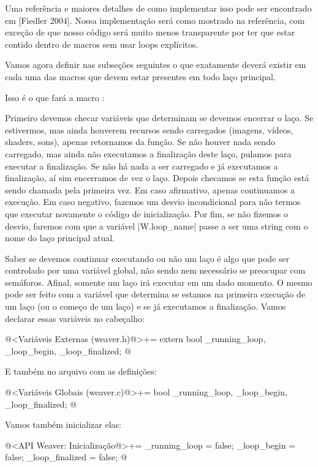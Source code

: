 Uma referência e maiores detalhes de como implementar isso pode ser
encontrado em [Fiedler 2004]. Nossa implementação será como mostrado
na referência, com exceção de que nosso código será muito menos
transparente por ter que estar contido dentro de macros sem usar loops
explícitos.

Vamos agora definir nas subseções seguintes o que exatamente deverá
existir em cada uma das macros que devem estar presentes em todo laço
principal.


Isso é o que fará a macro :

Primeiro devemos checar variáveis que determinam se devemos encerrar o
laço. Se estivermos, mas ainda houverem recursos sendo carregados
(imagens, vídeos, shaders, sons), apenas retornamos da função. Se não
houver nada sendo carregado, mas ainda não executamos a finalização
deste laço, pulamos para executar a finalização. Se não há nada a ser
carregado e já executamos a finalização, aí sim encerramos de vez o
laço. Depois checamos se esta função está sendo chamada pela primeira
vez. Em caso afirmativo, apenas continuamos a execução. Em caso
negativo, fazemos um desvio incondicional para não termos que executar
novamente o código de inicialização. Por fim, se não fizemos o desvio,
faremos com que a variável |W.loop_name| passe a ser uma string com o
nome do laço principal atual.

Saber se devemos continuar executando ou não um laço é algo que pode
ser controlado por uma variável global, não sendo nem necessário se
preocupar com semáforos. Afinal, somente um laço irá executar em um
dado momento. O mesmo pode ser feito com a variável que determina se
estamos na primeira execução de um laço (ou o começo de um laço) e se
já executamos a finalização. Vamos declarar essas variáveis no
cabeçalho:

\iniciocodigo
@<Variáveis Externas (weaver.h)@>+=
extern bool _running_loop, _loop_begin, _loop_finalized;
@
\fimcodigo

E também no arquivo com as definições:

\iniciocodigo
@<Variáveis Globais (weaver.c)@>+=
bool _running_loop, _loop_begin, _loop_finalized;
@
\fimcodigo

Vamos também inicializar elas:

\iniciocodigo
@<API Weaver: Inicialização@>+=
_running_loop = false;
_loop_begin = false;
_loop_finalized = false;
@
\fimcodigo


